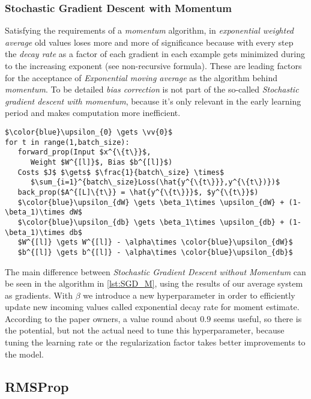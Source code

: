 \documentclass[dvipsnames,twocolumn]{scrartcl}
\begin{document}
	\subsubsection{Stochastic Gradient Descent with Momentum}
	
	Satisfying the requirements of a \emph{momentum} algorithm, in  \emph{exponential weighted average} old values loses more and more of significance because with every step the \emph{decay rate} as a factor of each gradient in each example gets minimized during to the increasing exponent (see non-recursive formula). These are leading factors for the acceptance of \emph{Exponential moving average} as the algorithm behind \emph{momentum}. To be detailed \emph{bias correction} is not part of the so-called \emph{Stochastic gradient descent with momentum}, because it's only relevant in the early learning period and makes computation more inefficient.
	\begin{lstlisting}[frame=single,caption={\texttt{Stochastic Gradient Descent with Momentum} Algorithm},label={lst:SGD_M}]
$\color{blue}\upsilon_{0} \gets \vv{0}$
for t in range(1,batch_size):
   forward_prop(Input $x^{\{t\}}$,
      Weight $W^{[l]}$, Bias $b^{[l]}$)
   Costs $J$ $\gets$ $\frac{1}{batch\_size} \times$
      $\sum_{i=1}^{batch\_size}Loss(\hat{y^{\{t\}}},y^{\{t\})})$
   back_prop($A^{[L]\{t\}} = \hat{y^{\{t\}}}$, $y^{\{t\}}$)
   $\color{blue}\upsilon_{dW} \gets \beta_1\times \upsilon_{dW} + (1-\beta_1)\times dW$
   $\color{blue}\upsilon_{db} \gets \beta_1\times \upsilon_{db} + (1-\beta_1)\times db$
   $W^{[l]} \gets W^{[l]} - \alpha\times \color{blue}\upsilon_{dW}$
   $b^{[l]} \gets b^{[l]} - \alpha\times \color{blue}\upsilon_{db}$
	\end{lstlisting}
	
	The main difference between \emph{Stochastic Gradient Descent without Momentum} can be seen in the algorithm in \autoref{lst:SGD_M}, using the results of our average system as gradients. With $\beta$ we introduce a new hyperparameter in order to efficiently update new incoming values called exponential decay rate for moment estimate. According to the paper owners, a value round about $0.9$ seems useful, so there is the potential, but not the actual need to tune this hyperparameter, because tuning the learning rate or the regularization factor takes better improvements to the model.
	
	\subsection{RMSProp}
	
\end{document}
